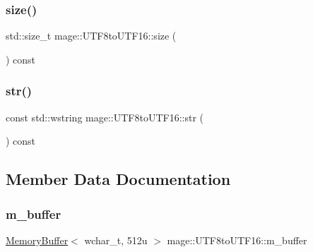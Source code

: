 \subsubsection{\texorpdfstring{size()}{size()}}
{\footnotesize\ttfamily std\+::size\+\_\+t mage\+::\+U\+T\+F8to\+U\+T\+F16\+::size (\begin{DoxyParamCaption}{ }\end{DoxyParamCaption}) const\hspace{0.3cm}{\ttfamily [noexcept]}}

\mbox{\label{classmage_1_1_u_t_f8to_u_t_f16_a13ed0bb76f581d0318ab5607c5ca6ee9}} 
\subsubsection{\texorpdfstring{str()}{str()}}
{\footnotesize\ttfamily const std\+::wstring mage\+::\+U\+T\+F8to\+U\+T\+F16\+::str (\begin{DoxyParamCaption}{ }\end{DoxyParamCaption}) const}



\subsection{Member Data Documentation}
\mbox{\label{classmage_1_1_u_t_f8to_u_t_f16_a223961be9fc0502559c3babbce664dcc}} 
\subsubsection{\texorpdfstring{m\+\_\+buffer}{m\_buffer}}
{\footnotesize\ttfamily \mbox{\hyperlink{classmage_1_1_memory_buffer}{Memory\+Buffer}}$<$ wchar\+\_\+t, 512u $>$ mage\+::\+U\+T\+F8to\+U\+T\+F16\+::m\+\_\+buffer\hspace{0.3cm}{\ttfamily [private]}}

